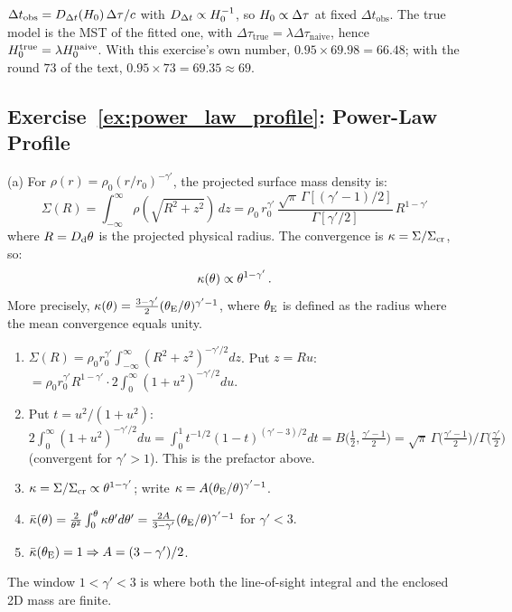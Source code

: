 \begin{derivation}
$\Delta t_{\mathrm{obs}} = D_{\Delta t}(H_0)\,\Delta\tau/c$ with
$D_{\Delta t} \propto H_0^{-1}$, so $H_0 \propto \Delta\tau$ at fixed
$\Delta t_{\mathrm{obs}}$.  The true model is the MST of the fitted one, with
$\Delta\tau_{\mathrm{true}} = \lambda\Delta\tau_{\mathrm{naive}}$, hence
$H_0^{\mathrm{true}} = \lambda H_0^{\mathrm{naive}}$.  With this
exercise's own number, $0.95\times69.98 = 66.48$; with the round $73$ of the
text, $0.95\times73 = 69.35 \approx 69$.
\end{derivation}


\subsection*{Exercise~\ref{ex:power_law_profile}: Power-Law Profile}

(a) For $\rho(r) = \rho_0(r/r_0)^{-\gamma'}$, the projected
surface mass density is:
\begin{equation*}
    \Sigma(R) = \int_{-\infty}^{\infty} \rho(\sqrt{R^2 + z^2})\,dz
    = \rho_0\,r_0^{\gamma'}\,\frac{\sqrt{\pi}\,\Gamma[(\gamma'-1)/2]}
    {\Gamma[\gamma'/2]}\,R^{1-\gamma'}
\end{equation*}
where $R = D_{\mathrm{d}}\theta$ is the projected physical radius.  The
convergence is $\kappa = \Sigma/\Sigma_{\mathrm{cr}}$, so:
\begin{equation*}
    \kappa(\theta) \propto \theta^{1-\gamma'} \,.
\end{equation*}
More precisely, $\kappa(\theta) = \frac{3-\gamma'}{2}
(\theta_{\mathrm{E}}/\theta)^{\gamma'-1}$, where $\theta_{\mathrm{E}}$ is defined as the
radius where the mean convergence equals unity. \checkmark

\begin{derivation}
\begin{enumerate}[nosep]
  \item $\Sigma(R) = \rho_0r_0^{\gamma'}\int_{-\infty}^{\infty}(R^2+z^2)^{-\gamma'/2}dz$.
        Put $z = Ru$:
        $= \rho_0r_0^{\gamma'}R^{1-\gamma'}\cdot2\int_0^\infty(1+u^2)^{-\gamma'/2}du$.
  \item Put $t = u^2/(1+u^2)$: $2\int_0^\infty(1+u^2)^{-\gamma'/2}du =
        \int_0^1t^{-1/2}(1-t)^{(\gamma'-3)/2}dt = B\big(\tfrac12,\tfrac{\gamma'-1}{2}\big)
        = \sqrt\pi\,\Gamma\big(\tfrac{\gamma'-1}{2}\big)/\Gamma\big(\tfrac{\gamma'}{2}\big)$
        (convergent for $\gamma' > 1$).  This is the prefactor above.
  \item $\kappa = \Sigma/\Sigma_{\mathrm{cr}} \propto \theta^{1-\gamma'}$; write
        $\kappa = A(\theta_{\mathrm{E}}/\theta)^{\gamma'-1}$.
  \item $\bar{\kappa}(\theta) = \frac{2}{\theta^2}\int_0^\theta\kappa\theta'd\theta'
        = \frac{2A}{3-\gamma'}(\theta_{\mathrm{E}}/\theta)^{\gamma'-1}$ for $\gamma' < 3$.
  \item $\bar{\kappa}(\theta_{\mathrm{E}}) = 1 \Rightarrow A = (3-\gamma')/2$.
\end{enumerate}
The window $1 < \gamma' < 3$ is where both the line-of-sight integral and the
enclosed 2D mass are finite.
\end{derivation}


